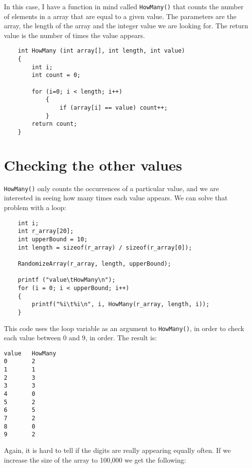 In this case, I have a function in mind called {\tt HowMany()} that
counts the number of elements in a array that are equal to a given value.
The parameters are the array, the length of the array and the integer value we are looking
for.  The return value is the number of times the value appears.

\begin{verbatim}
    int HowMany (int array[], int length, int value) 
    {
        int i; 
        int count = 0;
  
        for (i=0; i < length; i++) 
            {
                if (array[i] == value) count++;
            }
        return count;
    }
\end{verbatim}


\section{Checking the other values}

{\tt HowMany()} only counts the occurrences of a particular value, and
we are interested in seeing how many times each value appears.
We can solve that problem with a loop:

\begin{verbatim}
    int i;
    int r_array[20];
    int upperBound = 10;
    int length = sizeof(r_array) / sizeof(r_array[0]);
  
    RandomizeArray(r_array, length, upperBound);

    printf ("value\tHowMany\n");
    for (i = 0; i < upperBound; i++) 
    {
        printf("%i\t%i\n", i, HowMany(r_array, length, i));
    }
\end{verbatim}
%


This code uses the loop variable as an argument to
{\tt HowMany()}, in order to check each value between 0 and 9,
in order.  The result is:

\begin{verbatim}
value   HowMany
0       2
1       1
2       3
3       3
4       0
5       2
6       5
7       2
8       0
9       2
\end{verbatim}
%
Again, it is hard to tell if the digits are really appearing
equally often.  If we increase the size of the array to 100,000 we
get the following:

